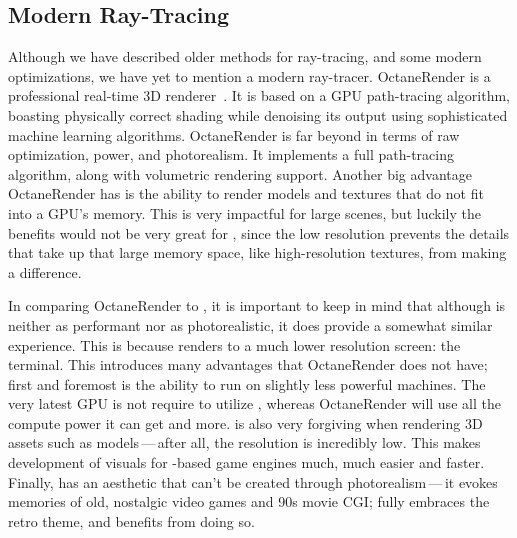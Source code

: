 \subsection{Modern Ray-Tracing}

Although we have described older methods for ray-tracing, and some modern optimizations, we have yet to mention a modern ray-tracer.
OctaneRender is a professional real-time 3D renderer~\cite{octane}.
It is based on a GPU path-tracing algorithm, boasting physically correct shading while denoising its output using sophisticated machine learning algorithms.
OctaneRender is far beyond \name{} in terms of raw optimization, power, and photorealism.
It implements a full path-tracing algorithm, along with volumetric rendering support.
Another big advantage OctaneRender has is the ability to render models and textures that do not fit into a GPU's memory.
This is very impactful for large scenes, but luckily the benefits would not be very great for \name{}, since the low resolution prevents the details that take up that large memory space, like high-resolution textures, from making a difference.

In comparing OctaneRender to \name{}, it is important to keep in mind that although \name{} is neither as performant nor as photorealistic, it does provide a somewhat similar experience.
This is because \name{} renders to a much lower resolution screen: the terminal.
This introduces many advantages that OctaneRender does not have; first and foremost is the ability to run on slightly less powerful machines.
The very latest GPU is not require to utilize \name{}, whereas OctaneRender will use all the compute power it can get and more.
 \name{} is also very forgiving when rendering 3D assets such as models\,---\,after all, the resolution is incredibly low.
This makes development of visuals for \name{}-based game engines much, much easier and faster.
Finally, \name{} has an aesthetic that can't be created through photorealism\,---\,it evokes memories of old, nostalgic video games and 90s movie CGI; \name{} fully embraces the retro theme, and benefits from doing so.
